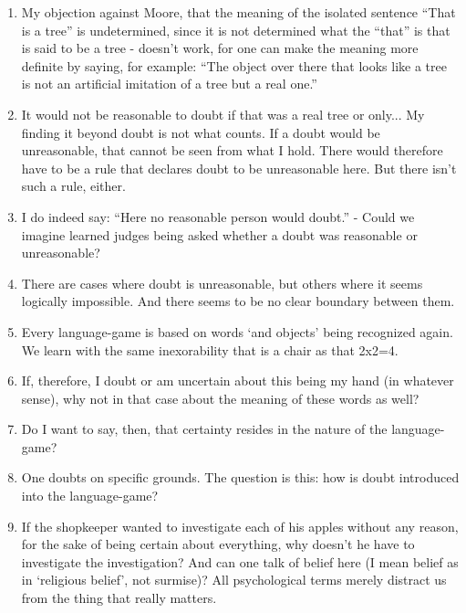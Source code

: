 \documentclass{book}
\begin{document}
\begin{enumerate}
\item
My objection against Moore, that the meaning of the isolated sentence ``That is
a tree'' is undetermined, since it is not determined what the ``that'' is that
is said to be a tree - doesn't work, for one can make the meaning more definite
by saying, for example: ``The object over there that looks like a tree is not
an artificial imitation of a tree but a real one.''

\item
It would not be reasonable to doubt if that was a real tree or only...  My
finding it beyond doubt is not what counts. If a doubt would be unreasonable,
that cannot be seen from what I hold. There would therefore have to be a rule
that declares doubt to be unreasonable here. But there isn't such a rule,
either.

\item
I do indeed say: ``Here no reasonable person would doubt.'' - Could we imagine
learned judges being asked whether a doubt was reasonable or unreasonable?

\item
There are cases where doubt is unreasonable, but others where it seems
logically impossible. And there seems to be no clear boundary between them.

\item
Every language-game is based on words `and objects' being recognized again. We
learn with the same inexorability that is a chair as that 2x2=4.

\item
If, therefore, I doubt or am uncertain about this being my hand (in whatever
sense), why not in that case about the meaning of these words as well?

\item
Do I want to say, then, that certainty resides in the nature of the
language-game?

\item
One doubts on specific grounds. The question is this: how is doubt introduced
into the language-game?

\item
If the shopkeeper wanted to investigate each of his apples without any reason,
for the sake of being certain about everything, why doesn't he have to
investigate the investigation? And can one talk of belief here (I mean belief
as in `religious belief', not surmise)? All psychological terms merely distract
us from the thing that really matters.


\end{enumerate}
\end{document}
